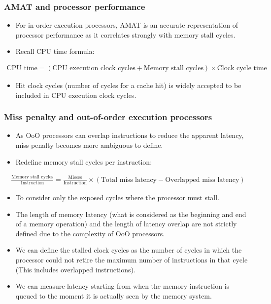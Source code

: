 \subsubsection{AMAT and processor performance}
\begin{itemize}
  \item For in-order execution processors, AMAT is an accurate representation of processor performance as it correlates strongly with memory stall cycles.
  \item Recall CPU time formula:
\end{itemize}
\begin{align}
  \text{CPU time} = (\text{CPU execution clock cycles} + \text{Memory stall cycles}) \times \text{Clock cycle time}
\end{align}
\begin{itemize}
  \item Hit clock cycles (number of cycles for a cache hit) is widely accepted to be included in CPU execution clock cycles.
\end{itemize}
\subsubsection{Miss penalty and out-of-order execution processors} 
\begin{itemize}
  \item As OoO processors can overlap instructions to reduce the apparent latency, miss penalty becomes more ambiguous to define. 
  \item Redefine memory stall cycles per instruction: 
\end{itemize}
\begin{align}
  \frac{\text{Memory stall cycles}}{\text{Instruction}} = \frac{\text{Misses}}{\text{Instruction}} \times (\text{Total miss latency} - \text{Overlapped miss latency})
\end{align}
\begin{itemize}
  \item To consider only the exposed cycles where the processor must stall.
  \item The length of memory latency (what is considered as the beginning and end of a memory operation) and the length of latency overlap are not strictly defined due to the complexity of OoO processors.
  \item We can define the stalled clock cycles as the number of cycles in which the processor could not retire the maximum number of instructions in that cycle (This includes overlapped instructions).
  \item We can measure latency starting from when the memory instruction is queued to the moment it is actually seen by the memory system.
\end{itemize}
